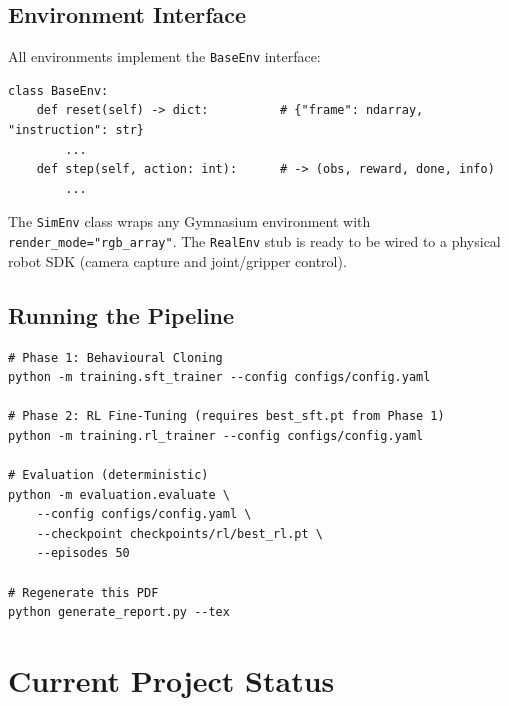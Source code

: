 \documentclass[12pt, a4paper]{article}
\begin{document}
\subsection{Environment Interface}

All environments implement the \texttt{BaseEnv} interface:

\begin{lstlisting}[style=Python, caption={BaseEnv interface.}]
class BaseEnv:
    def reset(self) -> dict:          # {"frame": ndarray, "instruction": str}
        ...
    def step(self, action: int):      # -> (obs, reward, done, info)
        ...
\end{lstlisting}

The \texttt{SimEnv} class wraps any Gymnasium environment with
\texttt{render\_mode="rgb\_array"}.
The \texttt{RealEnv} stub is ready to be wired to a physical robot SDK
(camera capture and joint/gripper control).

\subsection{Running the Pipeline}

\begin{lstlisting}[style=Bash, caption={Training and evaluation commands.}]
# Phase 1: Behavioural Cloning
python -m training.sft_trainer --config configs/config.yaml

# Phase 2: RL Fine-Tuning (requires best_sft.pt from Phase 1)
python -m training.rl_trainer --config configs/config.yaml

# Evaluation (deterministic)
python -m evaluation.evaluate \
    --config configs/config.yaml \
    --checkpoint checkpoints/rl/best_rl.pt \
    --episodes 50

# Regenerate this PDF
python generate_report.py --tex
\end{lstlisting}

\newpage

\section{Current Project Status}
\label{sec:status}
\end{document}
